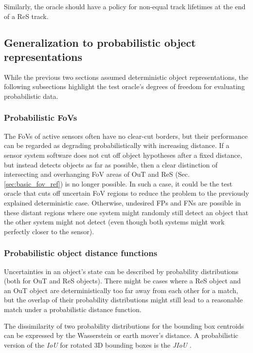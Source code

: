 \documentclass[conference]{IEEEtran}
\begin{document}
Similarly, the oracle should have a policy for non-equal track lifetimes at the end of a ReS track. 



\subsection{Generalization to probabilistic object representations}
\label{sec:oracle_probabilistic}

While the previous two sections assumed deterministic object representations, the following subsections highlight the test oracle's degrees of freedom for evaluating probabilistic data.

\subsubsection{Probabilistic FoVs}
\label{sec:prob_fov}

The FoVs of active sensors often have no clear-cut borders, but their performance can be regarded as degrading probabilistically with increasing distance. 
If a sensor system software does not cut off object hypotheses after a fixed distance, but instead detects objects as far as possible, then a clear distinction of intersecting and overhanging FoV areas of OuT and ReS (Sec. \ref{sec:basic_fov_ref}) is no longer possible.
In such a case, it could be the test oracle that cuts off uncertain FoV regions to reduce the problem to the previously explained deterministic case.
Otherwise, undesired FPs and FNs are possible in these distant regions where one system might randomly still detect an object that the other system might not detect (even though both systems might work perfectly closer to the sensor).


\subsubsection{Probabilistic object distance functions}
\label{sec:prob_bbox}
Uncertainties in an object's state can be described by probability distributions (both for OuT and ReS objects). 
There might be cases where a ReS object and an OuT object are deterministically too far away from each other for a match, but the overlap of their probability distributions might still lead to a reasonable match under a probabilistic distance function.

The dissimilarity of two probability distributions for the bounding box centroids can be expressed by the Wasserstein or earth mover's distance.
A probabilistic version of the \textit{IoU} for rotated 3D bounding boxes is the \textit{JIoU} \cite{Wang2020inferring_iros}.
\end{document}
